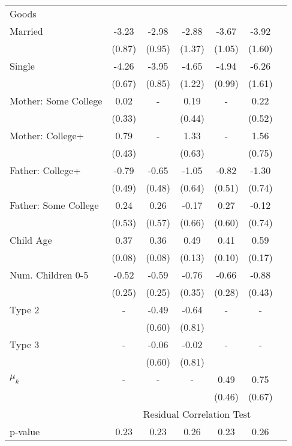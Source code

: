 \begin{tabular}{lcccccc}
Goods}\\\cmidrule(r){2-7}Married&-3.23&-2.98&-2.88&-3.67&-3.92&\\&(0.87)&(0.95)&(1.37)&(1.05)&(1.60)&\\Single&-4.26&-3.95&-4.65&-4.94&-6.26&\\&(0.67)&(0.85)&(1.22)&(0.99)&(1.61)&\\Mother: Some College&0.02&-&0.19&-&0.22&\\&(0.33)&&(0.44)&&(0.52)&\\Mother: College+&0.79&-&1.33&-&1.56&\\&(0.43)&&(0.63)&&(0.75)&\\Father: College+&-0.79&-0.65&-1.05&-0.82&-1.30&\\&(0.49)&(0.48)&(0.64)&(0.51)&(0.74)&\\Father: Some College&0.24&0.26&-0.17&0.27&-0.12&\\&(0.53)&(0.57)&(0.66)&(0.60)&(0.74)&\\Child Age&0.37&0.36&0.49&0.41&0.59&\\&(0.08)&(0.08)&(0.13)&(0.10)&(0.17)&\\Num. Children 0-5&-0.52&-0.59&-0.76&-0.66&-0.88&\\&(0.25)&(0.25)&(0.35)&(0.28)&(0.43)&\\Type 2&-&-0.49&-0.64&-&-&\\&&(0.60)&(0.81)&&&\\Type 3&-&-0.06&-0.02&-&-&\\&&(0.60)&(0.81)&&&\\$\mu_{k}$&-&-&-&0.49&0.75&\\&&&&(0.46)&(0.67)&\\& \multicolumn{6}{c}{Residual Correlation Test}\\\cmidrule(r){2-7}p-value&0.23&0.23&0.26&0.23&0.26&\\
\bottomrule\end{tabular}